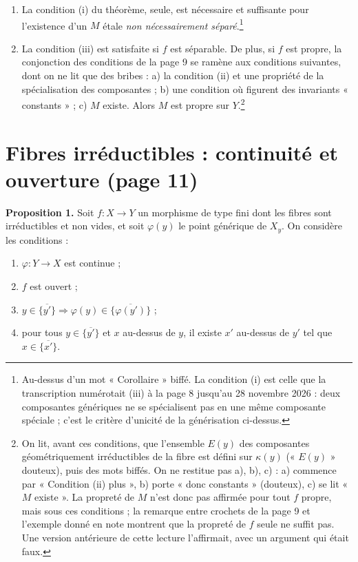 \documentclass[11pt,a4paper]{article}
\begin{document}
\begin{enumerate}
\item[1)] La condition (i) du théorème, seule, est nécessaire et suffisante
pour l'existence d'un $M$ étale \emph{non nécessairement séparé}.\footnote{Au-dessus
d'un mot « Corollaire » biffé. La condition (i) est celle que la
transcription numérotait (iii) à la page 8 jusqu'au 28 novembre 2026 :
deux composantes génériques ne se spécialisent pas en une même composante
spéciale ; c'est le critère d'unicité de la générisation ci-dessus.}
\item[2)] La condition (iii) est satisfaite si $f$ est séparable. De plus, si
$f$ est propre, la conjonction des conditions de la page 9 se ramène aux
conditions suivantes, dont on ne lit que des bribes : a) la condition (ii) et
une propriété de la spécialisation des composantes ; b) une condition où
figurent des invariants « constants » ; c) $M$ existe. Alors $M$ est propre
sur $Y$.\footnote{On lit, avant ces conditions, que l'ensemble $E(y)$ des
composantes géométriquement irréductibles de la fibre est défini sur
$\kappa(y)$ (« $E(y)$ » douteux), puis des mots biffés. On ne restitue pas
a), b), c) : a) commence par « Condition (ii) plus », b) porte « donc
constants » (douteux), c) se lit « $M$ existe ». La propreté de $M$ n'est donc
pas affirmée pour tout $f$ propre, mais sous ces conditions ; la remarque
entre crochets de la page 9 et l'exemple donné en note montrent que la
propreté de $f$ seule ne suffit pas. Une version antérieure de cette lecture
l'affirmait, avec un argument qui était faux.}
\end{enumerate}

\section*{Fibres irréductibles : continuité et ouverture (page 11)}

\textbf{Proposition 1.} Soit $f : X \to Y$ un morphisme de type fini dont les
fibres sont irréductibles et non vides, et soit $\varphi(y)$ le point générique
de $X_y$. On considère les conditions :

\begin{enumerate}
\item[(i)] $\varphi : Y \to X$ est continue ;
\item[(ii)] $f$ est ouvert ;
\item[(iii)] $y \in \overline{\{y'\}} \Longrightarrow \varphi(y) \in \overline{\{\varphi(y')\}}$ ;
\item[(iii bis)] pour tous $y \in \overline{\{y'\}}$ et $x$ au-dessus de $y$, il
existe $x'$ au-dessus de $y'$ tel que $x \in \overline{\{x'\}}$.
\end{enumerate}
\end{document}
